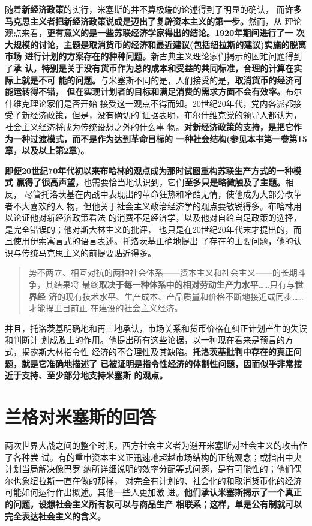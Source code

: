 随着\textbf{新经济政策}的实行，米塞斯的并不算极端的论述得到了明显的确认，
而\textbf{许多马克思主义者把新经济政策说成是迈出了复辟资本主义的第一步。}然而，从
理论观点来看，\textbf{更有意义的是一些苏联经济学家得出的结论。1920年期间进行了一
  次大规模的讨论，主题是取消货币的经济和最近建议(包括纽拉斯的建议)实施的脱离市场
  进行计划的方案存在的种种问题。}新古典主义理论家们揭示的困难问题得到了\textbf{承
  认，特别是关于没有货币作为总的成本和受益的共同标准，合理的计算在实际上就是不可
  能的问题。}与米塞斯不同的是，人们接受的是，\textbf{取消货币的经济可能运转得不错，
  但在实现计划者的目标和满足消费的需求方面不会有效率。}布尔什维克理论家们是否开始
接受这一观点不得而知。20世纪20年代，党内各派都接受了新经济政策，但是，没有确切的
证据表明，布尔什维克党的领导人都认为，社会主义经济将成为传统设想之外的什么事
物。\textbf{对新经济政策的支持，是把它作为一种过渡模式，而不是作为达到革命目标的
  一种社会结构(参见本书第一卷第15章，以及以上第2章)。}

\textbf{即便20世纪70年代初以来布哈林的观点成为那时试图重构苏联生产方式的一种模式
  赢得了很高声望，}也需要恰当地认识到，它们\textbf{至多只是略微触及了主题。}相反，
尽管托洛茨基在内战中表现出的革命狂热和冷酷无情，使他成为大部分改革者不大喜欢的人
物，但他关于社会主义政治经济学的观点要敏锐得多。布哈林用以论证他对新经济政策看法
的消费不足经济学，以及他对自给自足政策的选择，是完全错误的；他对斯大林主义的批评，
也只是在20世纪20年代末才提出的，而且使用伊索寓言式的语言表述。托洛茨基正确地提出
了存在的主要问题，他的认识与传统马克思主义的前提要贴近得多。
\begin{quotation}
  势不两立、相互对抗的两种社会体系——资本主义和社会主义——的长期斗争，其结果将
  最终\textbf{取决于每一种体系中的相对劳动生产力水平}……只有与\textbf{世界经
    济}的现有技术水平、生产成本、产品质量和价格不断地接近或同步……才能捍卫目前正
  在建设的社会主义经济。
\end{quotation}
并且，托洛茨基明确地和再三地承认，市场关系和货币价格在纠正计划产生的失误和判断计
划成败上的作用。他提出所有这些论据，以一种现在看来是预言的方式，揭露斯大林指令性
经济的不合理性及其缺陷。\textbf{托洛茨基批判中存在的真正问题，就是它准确地描述了
  已被证明是指令性经济的体制性问题，因而似乎非常接近于支持、至少部分地支持米塞斯
  的观点。}

\section{兰格对米塞斯的回答}

两次世界大战之间的整个时期，西方社会主义者为避开米塞斯对社会主义的攻击作了各种尝
试。有的重申资本主义正迅速地超越市场结构的正统观念；或指出中央计划当局解决像巴罗
纳所详细说明的效率分配等式问题，是有可能性的；他们偶尔也象纽拉斯一直在做的那样，
对完全有计划的、社会化的和取消货币化的经济可能如何运行作出概述。其他一些人更加激
进。\textbf{他们承认米塞斯揭示了一个真正的问题，设想社会主义所有权可以与商品生产
  相联系；这样，单是公有制就可以完全表达社会主义的含义。}


